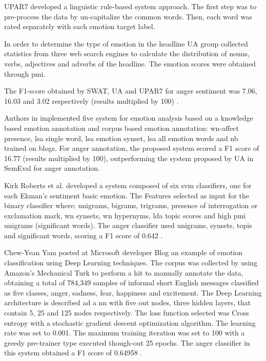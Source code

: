 UPAR7 developed a linguistic rule-based system approach. The first step was to pre-process the data by un-capitalize the common words. Then, each word was rated separately with each emotion target label. 

In order to determine the type of emotion in the headline UA group collected statistics from three web search engines to calculate the distribution of nouns, verbs, adjectives and adverbs of the headline. The emotion scores were obtained through \acrfull{pmi}.

The F1-score obtained by SWAT, UA and UPAR7 for anger sentiment was 7.06, 16.03 and 3.02 respectively (results multiplied by 100) \cite{strapparava2007semeval}.

Authors in \cite{strapparava2008learning} implemented five system for emotion analysis based on a knowledge based emotion annotation and corpus based emotion annotation: \acrshort{wn}-affect presence, \acrshort{lsa} single word, \acrshort{lsa} emotion synset, \acrshort{lsa} all emotion words and \acrshort{nb} trained on blogs. For anger annotation, the proposed system scored a F1 score of 16.77 (results multiplied by 100), outperforming the system proposed by UA in SemEval for anger annotation.

Kirk Roberts et al. developed a system composed of six \acrshort{svm} classifiers, one for each Ekman's sentiment basic emotion. The Features selected as input for the binary classifier where: unigrams, bigrams, trigrams, presence of interrogation or exclamation mark, \acrlong{wn} synsets, \acrshort{wn} hypernyms, \acrlong{lda} topic scores and high \acrshort{pmi} unigrams (significant words). The anger classifier used unigrams, synsets, topis and significant words, scoring a F1 score of 0.642 \cite{roberts2012empatweet}.

Chew-Yean Yam posted at Microsoft developer Blog an example of emotion classification using Deep Learning techniques. The corpus was collected by using Amazon's Mechanical Turk to perform a \acrfull{hit} to manually annotate the data, obtaining a total of 784,349 samples of informal short English messages classified as five classes, anger, sadness, fear, happiness and excitement. The Deep Learning architecture is described ad a \acrfull{nn} with five out nodes, three hidden layers, that contain 5, 25 and 125 nodes respectively. The loss function selected was Cross entropy with a stochastic gradient descent optimization algorithm. The learning rate was set to 0.001. The maximum training iteration was set to 100 with a greedy pre-trainer type executed though-out 25 epochs. The anger classifier in this system obtained a F1 score of 0.64958 \cite{microsoftEmotionAPI}.



